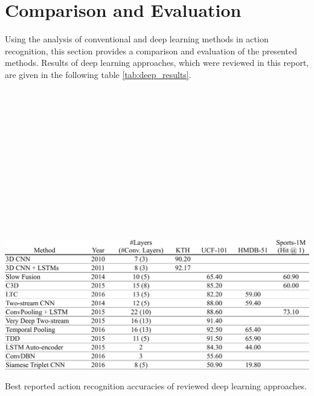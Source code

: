 \section{Comparison and Evaluation}
\label{sec:evaluation}
Using the analysis of conventional and deep learning methods in action recognition, this section provides a comparison and evaluation of the presented methods.
Results of deep learning approaches, which were reviewed in this report, are given in the following table \ref{tab:deep_results}.

\begin{minipage}[b]{.03\linewidth}
\scriptsize
\cite{ji_3d_2013}\\
\cite{baccouche_sequential_2011}\\
\cite{karpathy_large-scale_2014}\\
\cite{tran_learning_2015}\\
\cite{varol_long-term_2016}\\
\cite{simonyan_two-stream_2014}\\
\cite{ng_beyond_2015}\\
\cite{wang_towards_2015}\\
\cite{feichtenhofer_convolutional_2016}\\
\cite{wang_action_2015}\\
\cite{srivastava_unsupervised_2015}
\cite{palasek_action_2016}
\cite{misra_shuffle_2016}
\\\\
\end{minipage}
\begin{minipage}[b]{.96\linewidth}
\begin{table}[H]
    \centering
    \includegraphics[width=\textwidth]{img_evaluation/deep_results}
    \caption{Best reported action recognition accuracies of reviewed deep learning approaches.}
    \label{tab:deep_results}
\end{table}
\end{minipage}

